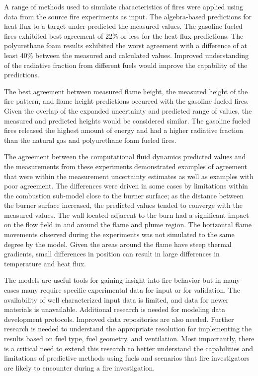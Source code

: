 \documentclass[twoside]{uocthesis}
\begin{document}
{A range of methods used to simulate characteristics of fires were applied using data from the source fire experiments as input.  The algebra-based predictions for heat flux to a target under-predicted the measured values.  The gasoline fueled fires exhibited best agreement of 22\% or less for the heat flux predictions.  The polyurethane foam results exhibited the worst agreement with a difference of at least 40\% between the measured and calculated values.  Improved understanding of the radiative fraction from different fuels would improve the capability of the predictions.  

The best agreement between measured flame height, the measured height of the fire pattern, and flame height predictions occurred with the gasoline fueled fires.  Given the overlap of the expanded uncertainty and predicted range of values, the measured and predicted heights would be considered similar.  The gasoline fueled fires released the highest amount of energy and had a higher radiative fraction than the natural gas and polyurethane foam fueled fires.  

The agreement between the computational fluid dynamics predicted values and the measurements from these experiments demonstrated examples of agreement that were within the measurement uncertainty estimates as well as examples with poor agreement.  The differences were driven in some cases by limitations within the combustion sub-model close to the burner surface; as the distance between the burner surface increased, the predicted values tended to converge with the measured values.  The wall located adjacent to the burn had a significant impact on the flow field in and around the flame and plume region.  The horizontal flame movements observed during the experiments was not simulated to the same degree by the model.  Given the areas around the flame have steep thermal gradients, small differences in position can result in large differences in temperature and heat flux.      

The models are useful tools for gaining insight into fire behavior but in many cases many require specific experimental data for input or for validation. The availability of well characterized input data is limited, and data for newer materials is unavailable. Additional research is needed for modeling data development protocols.  Improved data repositories are also needed. Further research is needed to understand the appropriate resolution for implementing the results based on fuel type, fuel geometry, and ventilation.  Most importantly, there is a critical need to extend this research to better understand the capabilities and limitations of predictive methods using fuels and scenarios that fire investigators are likely to encounter during a fire investigation.  
}
\end{document}
